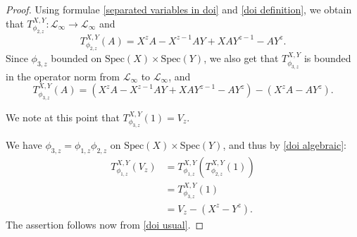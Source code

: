 \begin{proof}
        Using formulae \eqref{separated variables in doi} and \eqref{doi definition}, we obtain that $T^{X,Y}_{\phi_{2,z}}:\mathcal{L}_{\infty}\to\mathcal{L}_{\infty}$ and
        $$T^{X,Y}_{\phi_{2,z}}(A) = X^zA-X^{z-1}AY+XAY^{z-1}-AY^z.$$
        Since $\phi_{3,z}$ bounded on $\mathrm{Spec}(X) \times \mathrm{Spec}(Y)$, we also get that $T^{X,Y}_{\phi_{3,z}}$ is bounded in the operator norm from $\mathcal{L}_\infty$ to $\mathcal{L}_\infty$, and
        $$T^{X,Y}_{\phi_{3,z}}(A)=(X^zA-X^{z-1}AY+XAY^{z-1}-AY^z)-(X^zA-AY^z).$$
        
        We note at this point that $T^{X,Y}_{\phi_{3,z}}(1) = V_z$.

        We have $\phi_{3,z}=\phi_{1,z}\phi_{2,z}$ on $\mathrm{Spec}(X)\times \mathrm{Spec}(Y)$, and thus by \eqref{doi algebraic}:
        \begin{align*}
            T^{X,Y}_{\phi_{1,z}}(V_z) &= T^{X,Y}_{\phi_{1,z}}(T^{X,Y}_{\phi_{2,z}}(1))\\
                                      &= T^{X,Y}_{\phi_{3,z}}(1)\\
                                      &= V_z-(X^z-Y^z).
        \end{align*}
        The assertion follows now from \eqref{doi usual}.
    \end{proof}

